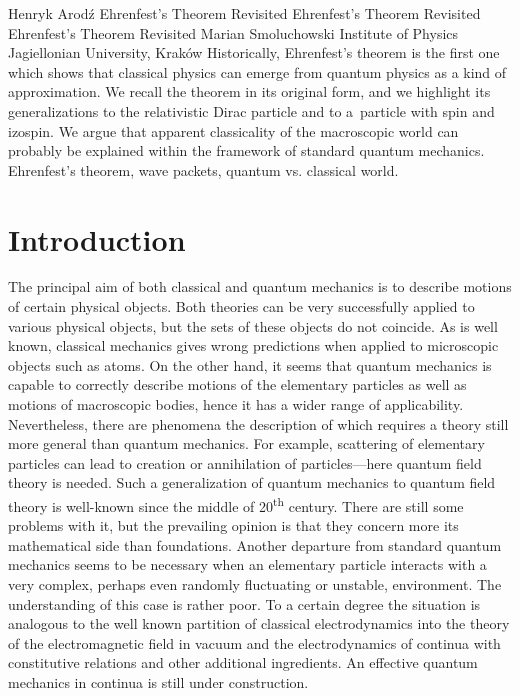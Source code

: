 \begin{artengenv}{Henryk Arod\'z}
	{Ehrenfest's Theorem Revisited}
	{Ehrenfest's Theorem Revisited}
	{Ehrenfest's Theorem Revisited}
	{Marian Smoluchowski Institute of Physics \\ Jagiellonian University, Krak\'ow\label{arodz-start}}
	{Historically, Ehrenfest's theorem \parencite*{ehr} is the first one which shows that classical physics can emerge from quantum physics as a kind of approximation. We recall the theorem in its original form, and we highlight its generalizations to the relativistic Dirac particle and to a~particle with spin and izospin. We argue that apparent classicality of the macroscopic world can probably be explained within the framework of standard quantum mechanics.}
	{Ehrenfest's theorem, wave packets, quantum vs. classical world.}







\section{Introduction}


\lettrine[loversize=0.13,lines=2,lraise=-0.05,nindent=0em,findent=0.2pt]%
{T}{}he principal aim of both classical and quantum mechanics is to describe motions of certain physical objects. Both theories can be very successfully applied to various physical objects, but the sets of these objects do not coincide. As is well known, classical mechanics gives wrong predictions when applied to microscopic objects such as atoms. On the other hand, it seems that quantum mechanics is capable to correctly describe motions of the elementary particles as well as motions of macroscopic bodies, hence it has a wider range of applicability. Nevertheless, there are phenomena the description of which requires a theory still more general than quantum mechanics. For example, scattering of elementary particles can lead to creation or annihilation of particles---here quantum field theory is needed. Such a generalization of quantum mechanics to quantum field theory is well-known since the middle of 20\textsuperscript{th} century. There are still some problems with it, but the prevailing opinion is that they concern more its mathematical side than foundations. Another departure from standard quantum mechanics seems to be necessary when an elementary particle interacts with a very complex, perhaps even randomly fluctuating or unstable, environment. The understanding of this case is rather poor. To a certain degree the situation is analogous to the well known partition of classical electrodynamics into the theory of the electromagnetic field in vacuum and the electrodynamics of 
continua with constitutive relations and other additional ingredients. An effective quantum mechanics in continua is still 
under construction. 






\end{artengenv}
